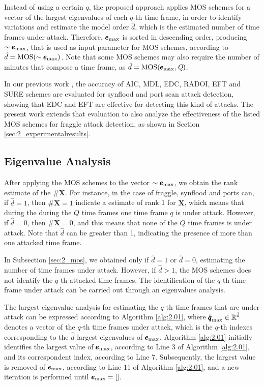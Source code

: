 Instead of using a certain $q$, the proposed approach applies MOS schemes for a vector of the largest eigenvalues of each $q$-th time frame, in order to identify variations and estimate the model order $\hat{d}$, which is the estimated number of time frames under attack. Therefore, $\pmb{e}_{\rm max}$ is sorted in descending order, producing $\sim\pmb{e}_{\rm max}$, that is used as input parameter for MOS schemes, according to $\hat{d} = \rm{MOS}(\sim\pmb{e}_{\rm max})$. Note that some MOS schemes may also require the number of minutes that compose a time frame, as $\hat{d} = \rm{MOS}(\pmb{e}_{\rm max},\emph{Q})$.

In our previous work \cite{tenorio2013greatest}, the accuracy of AIC, MDL, EDC, RADOI, EFT and SURE schemes are evaluated for synflood and port scan attack detection, showing that EDC and EFT are effective for detecting this kind of attacks. The present work extends that evaluation to also analyze the effectiveness of the listed MOS schemes for fraggle attack detection, as shown in Section \ref{sec:2_experimentalresults}.

\subsection{Eigenvalue Analysis}
\label{sec:2_prop_EigenvalueAnalysis}

After applying the MOS schemes to the vector $\sim\pmb{e}_{\rm max}$, we obtain the rank estimate of the $\#\pmb{X}$. For instance, in the case of fraggle, synflood and ports can, if $\hat{d} = 1$, then $\#\pmb{X} = 1$ indicate a estimate of rank 1 for $\pmb{X}$, which means that during the during the $Q$ time frames one time frame $q$ is under attack. However, if $\hat{d} = 0$, then $\#\pmb{X} = 0$, and this means that none of the $Q$ time frames is under attack. Note that $\hat{d}$ can be greater than 1, indicating the presence of more than one attacked time frame.

In Subsection \ref{sec:2_mos}, we obtained only if $\hat{d} = 1$ or $\hat{d} = 0$, estimating the number of time frames under attack. However, if $\hat{d} > 1$, the MOS schemes does not identify the $q$-th attacked time frames. The identification of the $q$-th time frame under attack can be carried out through an eigenvalues analysis.

The largest eigenvalue analysis for estimating the $q$-th time frames that are under attack can be expressed according to Algorithm \ref{alg:2.01}, where $\rm{\hat{\pmb{q}}}_{\rm max} \in \mathbb{R}^{\hat{d}}$ denotes a vector of the $q$-th time frames under attack, which is the $q$-th indexes corresponding to the $\hat{d}$ largest eigenvalues of $\pmb{e}_{\rm max}$. Algorithm \ref{alg:2.01} initially identifies the largest value of $\pmb{e}_{\rm max}$, according to Line 3 of Algorithm \ref{alg:2.01}, and its correspondent index, according to Line 7. Subsequently, the largest value is removed of $\pmb{e}_{\rm max}$, according to Line 11 of Algorithm \ref{alg:2.01}, and a new iteration is performed until $\pmb{e}_{\rm max} = []$.

